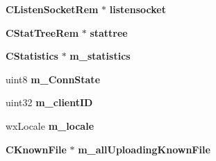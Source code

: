 \begin{DoxyCompactItemize}
\item 
{\bf CListenSocketRem} $\ast$ {\bfseries listensocket}\label{classCamuleRemoteGuiApp_a3fe260680071818cf2a9aec51cfdcb2f}

\item 
{\bf CStatTreeRem} $\ast$ {\bfseries stattree}\label{classCamuleRemoteGuiApp_ab5023a6b6287903ffe5a1ce106e8ed0d}

\item 
{\bf CStatistics} $\ast$ {\bfseries m\_\-statistics}\label{classCamuleRemoteGuiApp_a5a3a519edff2a3b9533cf26d31f3e775}

\item 
uint8 {\bfseries m\_\-ConnState}\label{classCamuleRemoteGuiApp_a9e764f5301cf17908a8a5e117e8fbf6a}

\item 
uint32 {\bfseries m\_\-clientID}\label{classCamuleRemoteGuiApp_a9d03f7615c680e9a0e688579ba1acc21}

\item 
wxLocale {\bfseries m\_\-locale}\label{classCamuleRemoteGuiApp_a496dcf8f6c98bc85c756d79143f7b3a8}

\item 
{\bf CKnownFile} $\ast$ {\bfseries m\_\-allUploadingKnownFile}\label{classCamuleRemoteGuiApp_a203c043060261d8cccd526fc5399fd2f}

\end{DoxyCompactItemize}
